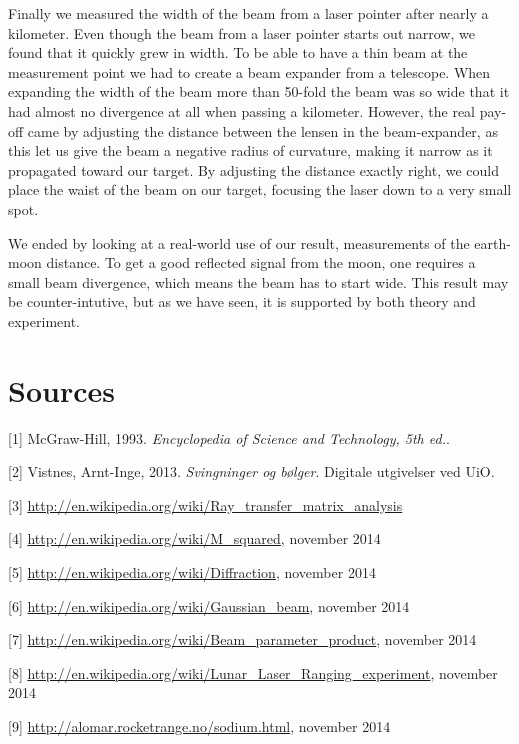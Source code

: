 \documentclass[a4paper, 11pt, notitlepage, english]{article}
\begin{document}
Finally we measured the width of the beam from a laser pointer after nearly a kilometer. Even though the beam from a laser pointer starts out narrow, we found that it quickly grew in width. To be able to have a thin beam at the measurement point we had to create a beam expander from a telescope. When expanding the width of the beam more than 50-fold the beam was so wide that it had almost no divergence at all when passing a kilometer. However, the real pay-off came by adjusting the distance between the lensen in the beam-expander, as this let us give the beam a negative radius of curvature, making it narrow as it propagated toward our target. By adjusting the distance exactly right, we could place the waist of the beam on our target, focusing the laser down to a very small spot.

We ended by looking at a real-world use of our result, measurements of the earth-moon distance. To get a good reflected signal from the moon, one requires a small beam divergence, which means the beam has to start wide. This result may be counter-intutive, but as we have seen, it is supported by both theory and experiment.








\clearpage


\section{Sources} 

[1] McGraw-Hill, 1993. \emph{Encyclopedia of Science and Technology, 5th ed.}.

[2] Vistnes, Arnt-Inge, 2013. \emph{Svingninger og bølger}. Digitale utgivelser ved UiO.

[3] \url{http://en.wikipedia.org/wiki/Ray_transfer_matrix_analysis}

[4] \url{http://en.wikipedia.org/wiki/M_squared}, november 2014

[5] \url{http://en.wikipedia.org/wiki/Diffraction}, november 2014

[6] \url{http://en.wikipedia.org/wiki/Gaussian_beam}, november 2014

[7] \url{http://en.wikipedia.org/wiki/Beam_parameter_product}, november 2014

[8] \url{http://en.wikipedia.org/wiki/Lunar_Laser_Ranging_experiment}, november 2014

[9] \url{http://alomar.rocketrange.no/sodium.html}, november 2014
\end{document}
